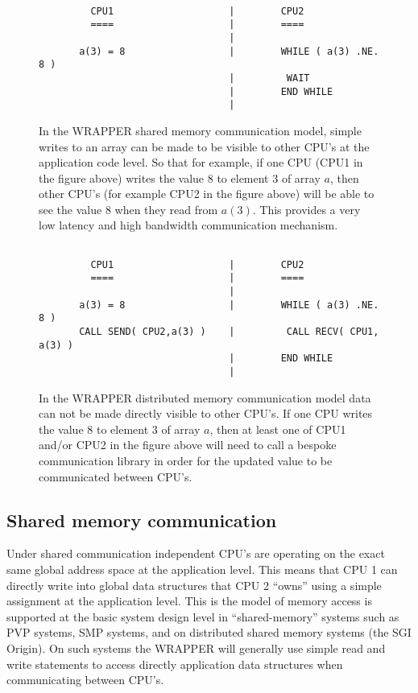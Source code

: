 \begin{figure}
\begin{verbatim}

         CPU1                    |        CPU2
         ====                    |        ====
                                 |
       a(3) = 8                  |        WHILE ( a(3) .NE. 8 ) 
                                 |         WAIT
                                 |        END WHILE
                                 |
\end{verbatim}
\caption{ In the WRAPPER shared memory communication model, simple writes to an
array can be made to be visible to other CPU's at the application code level.
So that for example, if one CPU (CPU1 in the figure above) writes the value $8$ to 
element $3$ of array $a$, then other CPU's (for example CPU2 in the figure above)
will be able to see the value $8$ when they read from $a(3)$.
This provides a very low latency and high bandwidth communication 
mechanism.
} \label{fig:simple_assign}
\end{figure}

\begin{figure}
\begin{verbatim}

         CPU1                    |        CPU2
         ====                    |        ====
                                 |
       a(3) = 8                  |        WHILE ( a(3) .NE. 8 )
       CALL SEND( CPU2,a(3) )    |         CALL RECV( CPU1, a(3) )
                                 |        END WHILE
                                 |
\end{verbatim}
\caption{ In the WRAPPER distributed memory communication model
data can not be made directly visible to other CPU's.
If one CPU writes the value $8$ to element $3$ of array $a$, then
at least one of CPU1 and/or CPU2 in the figure above will need
to call a bespoke communication library in order for the updated 
value to be communicated between CPU's.
} \label{fig:comm_msg}
\end{figure}

\subsection{Shared memory communication}
\label{sec:shared_memory_communication}

Under shared communication independent CPU's are operating
on the exact same global address space at the application level.
This means that CPU 1 can directly write into global 
data structures that CPU 2 ``owns'' using a simple
assignment at the application level. 
This is the model of memory access is supported at the basic system 
design level in ``shared-memory'' systems such as PVP systems, SMP systems,
and on distributed shared memory systems (the SGI Origin).
On such systems the WRAPPER will generally use simple read and write statements 
to access directly application data structures when communicating between CPU's.

